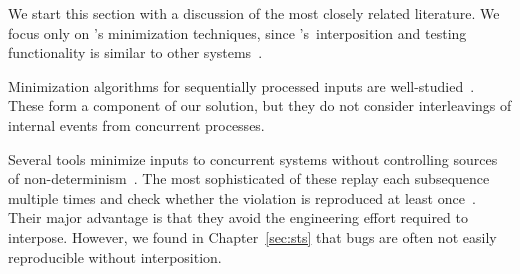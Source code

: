

%

We start this section with a discussion of the most closely
related literature. We focus only on \sys's minimization techniques, since
\sys's~interposition and testing functionality is similar to other
systems~\cite{lin2009modist,simsa2010dbug,leesatapornwongsa2014samc}.

 Minimization
algorithms for sequentially processed inputs are
well-studied~\cite{Zeller:2002:SIF:506201.506206,claessen2000quickcheck,regehr2012test,whitaker2004configuration,burger2011minimizing,fse_web_ddmin,chang2007simulation}.
These form a component of our solution, but they do not consider
interleavings of internal events from concurrent processes.

 Several
tools minimize inputs to concurrent
systems without controlling sources of non-determinism~\cite{arts2006testing,clause2007technique,tucek2007triage,jin2013f3,hughes2011testing}.
The most sophisticated of these replay each subsequence
multiple times and check whether the violation is reproduced at least once~\cite{hughes2011testing,claessen2009finding}.
Their major advantage is that they avoid the engineering effort required to
interpose. However, we found in Chapter~\ref{sec:sts}
 that bugs are often not easily reproducible without
interposition.

